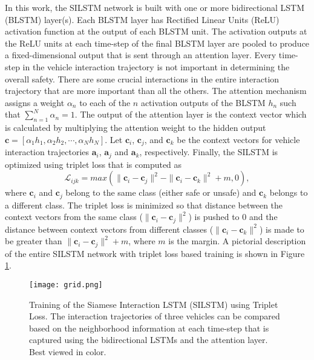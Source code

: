\documentclass[final,journal]{IEEEtran}
\begin{document}
In this work, the SILSTM network is built with one or more bidirectional LSTM (BLSTM) layer(s). Each BLSTM layer has Rectified Linear Units (ReLU) activation function at the output of each BLSTM unit. The activation outputs at the ReLU units at each time-step of the final BLSTM layer are pooled to produce a fixed-dimensional output that is sent through an attention layer. Every time-step in the vehicle interaction trajectory is not important in determining the overall safety. There are some crucial interactions in the entire interaction trajectory that are more important than all the others. The attention mechanism assigns a weight $\alpha_n$ to each of the $n$ activation outputs of the BLSTM $h_n$ such that $\sum_{n=1}^N \alpha_n = 1$. The output of the attention layer is the context vector which is calculated by multiplying the attention weight to the hidden output $\mathbf{c} = [\alpha_1 h_1, \alpha_2 h_2, \cdots, \alpha_N h_N]$.
Let $\mathbf{c}_i$, $\mathbf{c}_j$, and $\mathbf{c}_k$ be the context vectors for vehicle interaction trajectories $\mathbf{a}_i$, $\mathbf{a}_j$ and $\mathbf{a}_k$, respectively. Finally, the SILSTM is optimized using triplet loss that is computed as 
\begin{equation}
    \mathcal{L}_{ijk} = max(\| \mathbf{c}_i - \mathbf{c}_j \|^2 - \| \mathbf{c}_i - \mathbf{c}_k \|^2 +m, 0),
\end{equation}
where $\mathbf{c}_i$ and $\mathbf{c}_j$ belong to the same class (either safe or unsafe) and $\mathbf{c}_k$ belongs to a different class. The triplet loss is minimized so that distance between the context vectors from the same class ($\| \mathbf{c}_i - \mathbf{c}_j \|^2$) is pushed to 0 and the distance between context vectors from different classes ($ \| \mathbf{c}_i - \mathbf{c}_k \|^2$) is made to be greater than $\| \mathbf{c}_i - \mathbf{c}_j \|^2 + m$, where $m$ is the margin. A pictorial description of the entire SILSTM network with triplet loss based training is shown in Figure \ref{SILSTM}.

\begin{figure*}
    \centering
    \texttt{[image: grid.png]}
    \caption{Training of the Siamese Interaction LSTM (SILSTM) using Triplet Loss. The interaction trajectories of three vehicles can be compared based on the neighborhood information at each time-step that is captured using the bidirectional LSTMs and the attention layer. Best viewed in color.}
    \label{SILSTM}
\end{figure*}
\end{document}
